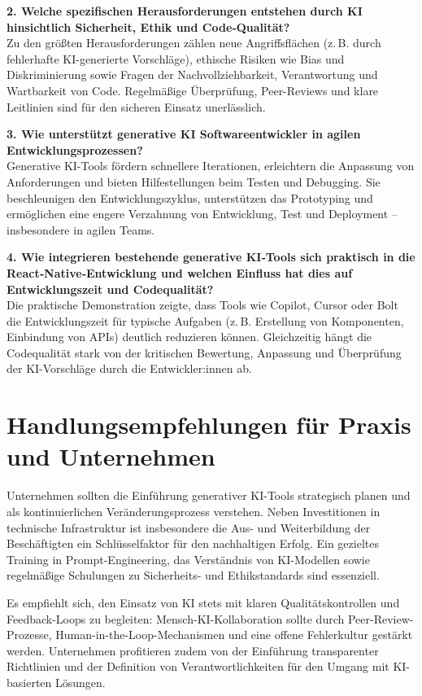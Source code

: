 \textbf{2. Welche spezifischen Herausforderungen entstehen durch KI hinsichtlich Sicherheit, Ethik und Code‑Qualität?}\\
Zu den größten Herausforderungen zählen neue Angriffsflächen (z.\,B. durch fehlerhafte KI-generierte Vorschläge), ethische Risiken wie Bias und Diskriminierung sowie Fragen der Nachvollziehbarkeit, Verantwortung und Wartbarkeit von Code. Regelmäßige Überprüfung, Peer-Reviews und klare Leitlinien sind für den sicheren Einsatz unerlässlich.

\textbf{3. Wie unterstützt generative KI Softwareentwickler in agilen Entwicklungsprozessen?}\\
Generative KI-Tools fördern schnellere Iterationen, erleichtern die Anpassung von Anforderungen und bieten Hilfestellungen beim Testen und Debugging. Sie beschleunigen den Entwicklungszyklus, unterstützen das Prototyping und ermöglichen eine engere Verzahnung von Entwicklung, Test und Deployment -- insbesondere in agilen Teams.

\textbf{4. Wie integrieren bestehende generative KI‑Tools sich praktisch in die React‑Native‑Entwicklung und welchen Einfluss hat dies auf Entwicklungszeit und Codequalität?}\\
Die praktische Demonstration zeigte, dass Tools wie Copilot, Cursor oder Bolt die Entwicklungszeit für typische Aufgaben (z.\,B. Erstellung von Komponenten, Einbindung von APIs) deutlich reduzieren können. Gleichzeitig hängt die Codequalität stark von der kritischen Bewertung, Anpassung und Überprüfung der KI-Vorschläge durch die Entwickler:innen ab.

\section{Handlungsempfehlungen für Praxis und Unternehmen}
Unternehmen sollten die Einführung generativer KI-Tools strategisch planen und
als kontinuierlichen Veränderungsprozess verstehen. Neben Investitionen in
technische Infrastruktur ist insbesondere die Aus- und Weiterbildung der
Beschäftigten ein Schlüsselfaktor für den nachhaltigen Erfolg. Ein gezieltes
Training in Prompt-Engineering, das Verständnis von KI-Modellen sowie
regelmäßige Schulungen zu Sicherheits- und Ethikstandards sind essenziell.

Es empfiehlt sich, den Einsatz von KI stets mit klaren Qualitätskontrollen und
Feedback-Loops zu begleiten: Mensch-KI-Kollaboration sollte durch
Peer-Review-Prozesse, Human-in-the-Loop-Mechanismen und eine offene
Fehlerkultur gestärkt werden. Unternehmen profitieren zudem von der Einführung
transparenter Richtlinien und der Definition von Verantwortlichkeiten für den
Umgang mit KI-basierten Lösungen.

